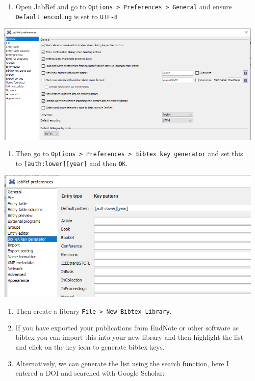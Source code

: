 \documentclass[12pt,]{book}
\providecommand{\tightlist}{%
  \setlength{\itemsep}{0pt}\setlength{\parskip}{0pt}}
\theoremstyle{definition}
\theoremstyle{definition}
\theoremstyle{definition}
\theoremstyle{remark}
\begin{document}
\begin{enumerate}
\def\labelenumi{\arabic{enumi}.}
\tightlist
\item
  Open JabRef and go to
  \texttt{Options\ \textgreater{}\ Preferences\ \textgreater{}\ General}
  and ensure \texttt{Default\ encoding} is set to \texttt{UTF-8}
\end{enumerate}

\includegraphics[width=1.2\linewidth]{img/jabref_general_settings}

\begin{enumerate}
\def\labelenumi{\arabic{enumi}.}
\setcounter{enumi}{1}
\tightlist
\item
  Then go to
  \texttt{Options\ \textgreater{}\ Preferences\ \textgreater{}\ Bibtex\ key\ generator}
  and set this to \texttt{{[}auth:lower{]}{[}year{]}} and then
  \texttt{OK}.
\end{enumerate}

\includegraphics[width=1.2\linewidth]{img/jabref_bibtex_key}

\begin{enumerate}
\def\labelenumi{\arabic{enumi}.}
\setcounter{enumi}{2}
\item
  Then create a library
  \texttt{File\ \textgreater{}\ New\ Bibtex\ Library}.
\item
  If you have exported your publications from EndNote or other software
  as bibtex you can import this into your new library and then highlight
  the list and click on the key icon to generate bibtex keys.
\item
  Alternatively, we can generate the list using the search function,
  here I entered a DOI and searched with Google Scholar:
\end{enumerate}
\end{document}
